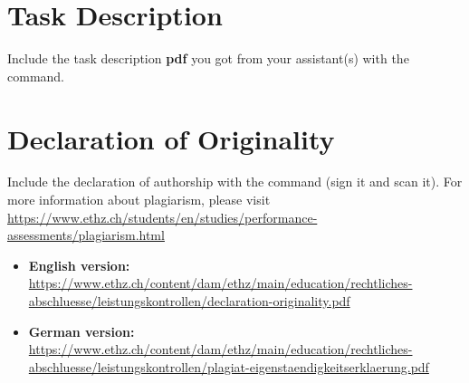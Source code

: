 
\chapter{Task Description}
Include the task description \textbf{pdf} you got from your
assistant(s) with the  command.
%


\chapter{Declaration of Originality}\label{chap:originality}
Include the declaration of authorship with the  command (sign it and scan it). For more information
about plagiarism, please visit
\url{https://www.ethz.ch/students/en/studies/performance-assessments/plagiarism.html}

\begin{itemize}
\item \textbf{English version:}
  \url{https://www.ethz.ch/content/dam/ethz/main/education/rechtliches-abschluesse/leistungskontrollen/declaration-originality.pdf}
\item \textbf{German version:}
  \url{https://www.ethz.ch/content/dam/ethz/main/education/rechtliches-abschluesse/leistungskontrollen/plagiat-eigenstaendigkeitserklaerung.pdf}
\end{itemize}

%


